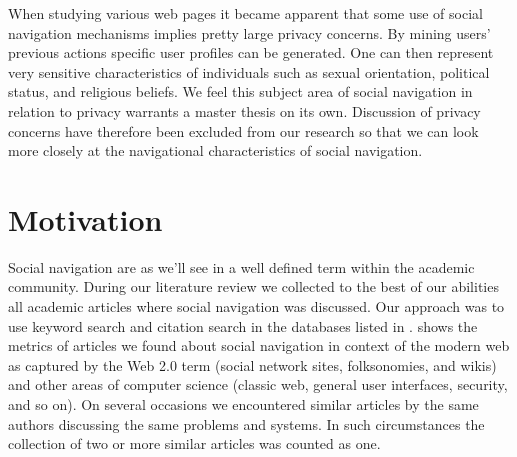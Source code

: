 When studying various web pages it became apparent that some use of
social navigation mechanisms implies pretty large privacy concerns. By mining
users' previous actions specific user profiles can be generated. One can then
represent very sensitive characteristics of individuals such as sexual
orientation, political status, and religious beliefs.
We feel this subject area of social navigation in relation to privacy warrants
a master thesis on its own. Discussion of privacy concerns have therefore
been excluded from our research so that we can look more closely at the
navigational characteristics of social navigation.

\section{Motivation}


Social navigation are as we'll see in
a well defined term within the academic community.
During our literature review we collected to the best of our abilities all
academic articles where social navigation was discussed. Our approach was to
use keyword search and citation search in the databases listed in
.%
 shows the metrics of articles
we found about social navigation in context of the modern web as captured by
the Web 2.0 term (social network sites, folksonomies, and wikis) and other
areas of computer science (classic web, general user interfaces, security, and
so on).
On several occasions we encountered similar articles by the same authors
discussing the same problems and systems. In such circumstances the collection
of two or more similar articles was counted as one.


